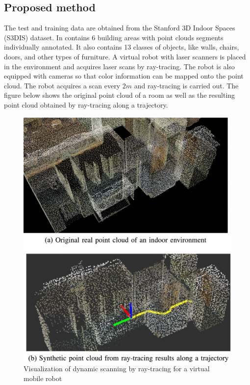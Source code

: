 \subsection{Proposed method}\label{header-n919}

The test and training data are obtained from the Stanford 3D Indoor
Spaces (S3DIS) dataset. In contains 6 building areas with point clouds
segments individually annotated. It also contains 13 classes of objects,
like walls, chairs, doors, and other types of furniture. A virtual robot
with laser scanners is placed in the environment and acquires laser
scans by ray-tracing. The robot is also equipped with cameras so that
color information can be mapped onto the point cloud. The robot acquires
a scan every $2m$ and ray-tracing is carried out. The figure below
shows the original point cloud of a room as well as the resulting point
cloud obtained by ray-tracing along a trajectory.

\begin{figure}[h!]
\centering
\includegraphics[width=0.7\linewidth]{images/pointclouds.png}
\caption{Visualization of dynamic scanning by ray-tracing for a virtual mobile robot}
\end{figure}

